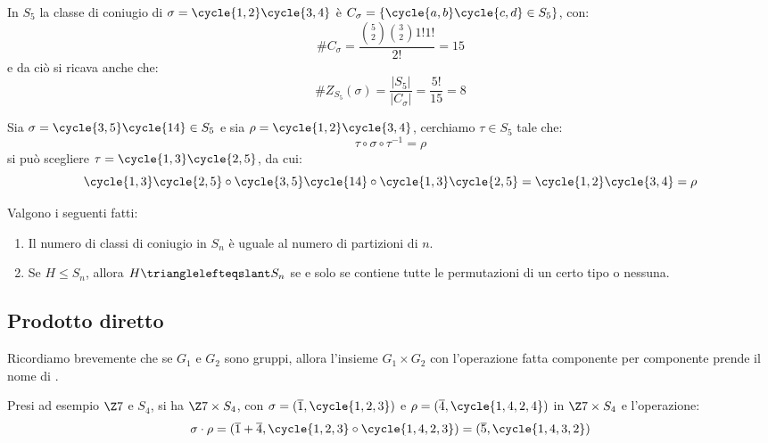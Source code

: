 \documentclass[11pt]{scrartcl}
\begin{document}
\begin{example}
    In $S_5$ la classe di coniugio di $\sigma = \cycle{1,2}\cycle{3,4}$ è $C_\sigma = \{\cycle{a,b}\cycle{c,d} \in S_5\}$, con:
        \[ \#C_\sigma = \frac{\binom{5}{2}\binom{3}{2}1!1!}{2!} = 15
            \]
    e da ciò si ricava anche che:
        \[ \#Z_{S_5}(\sigma) = \frac{|S_5|}{|C_\sigma|} = \frac{5!}{15} = 8
            \]
\end{example}

\begin{example}
    Sia $\sigma = \cycle{3,5}\cycle{14} \in S_5$ e sia $\rho = \cycle{1,2}\cycle{3,4}$, cerchiamo $\tau \in S_5$ tale che:
        \[ \tau\circ\sigma\circ\tau^{-1} = \rho
            \]
    si può scegliere $\tau = \cycle{1,3}\cycle{2,5}$, da cui:
        \[ \cycle{1,3}\cycle{2,5} \circ \cycle{3,5}\cycle{14} \circ \cycle{1,3}\cycle{2,5} = \cycle{1,2}\cycle{3,4} = \rho
            \]
\end{example}

\begin{corollary}
    \label{c:1.68}
    Valgono i seguenti fatti:
        \begin{enumerate}[(1)]
            \item Il numero di classi di coniugio in $S_n$ è uguale al numero di partizioni di $n$.
            \item Se $H \leqslant S_n$, allora $H \trianglelefteqslant S_n$ se e solo se contiene tutte le permutazioni di un certo tipo o nessuna.
        \end{enumerate}
\end{corollary}

\pagebreak

\subsection{Prodotto diretto}
Ricordiamo brevemente che se $G_1$ e $G_2$ sono gruppi, allora l'insieme $G_1 \times G_2$ con l'operazione fatta componente per componente prende il nome di .

\begin{example}
    Presi ad esempio $\Z7$ e $S_4$, si ha $\Z7 \times S_4$, con $\sigma = (\overline 1, \cycle{1,2,3})$ e $\rho = (\overline 4, \cycle{1,4,2,4})$ in $\Z7 \times S_4$ e l'operazione:
        \[ \sigma \cdot \rho = (\overline 1 + \overline 4, \cycle{1,2,3} \circ \cycle{1,4,2,3}) = (\overline 5, \cycle{1,4,3,2})
            \]
\end{example}
\end{document}
